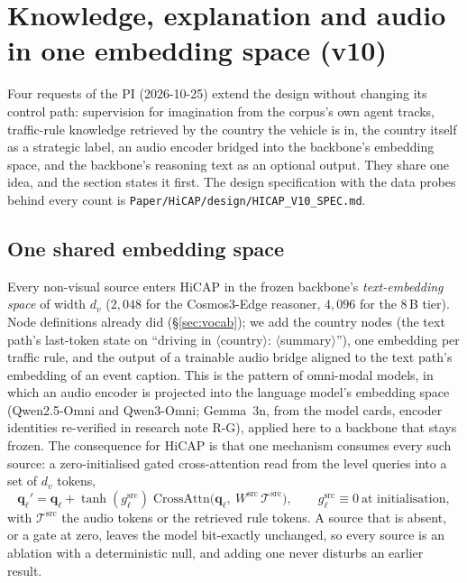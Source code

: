 \section{Knowledge, explanation and audio in one embedding space (v10)}\label{sec:v10}
Four requests of the PI (2026-10-25) extend the design without changing its control path: supervision for imagination from the corpus's own agent tracks, traffic-rule knowledge retrieved by the country the vehicle is in, the country itself as a strategic label, an audio encoder bridged into the backbone's embedding space, and the backbone's reasoning text as an optional output. They share one idea, and the section states it first. The design specification with the data probes behind every count is \texttt{Paper/HiCAP/design/HICAP\_V10\_SPEC.md}.

\subsection{One shared embedding space}\label{sec:shared-space}
Every non-visual source enters HiCAP in the frozen backbone's \emph{text-embedding space} of width $d_v$ ($2{,}048$ for the Cosmos3-Edge reasoner, $4{,}096$ for the 8\,B tier). Node definitions already did (\S\ref{sec:vocab}); we add the country nodes (the text path's last-token state on ``driving in $\langle$country$\rangle$: $\langle$summary$\rangle$''), one embedding per traffic rule, and the output of a trainable audio bridge aligned to the text path's embedding of an event caption. This is the pattern of omni-modal models, in which an audio encoder is projected into the language model's embedding space (Qwen2.5-Omni and Qwen3-Omni; Gemma~3n, \evP{} from the model cards, encoder identities re-verified in research note R-G), applied here to a backbone that stays frozen. The consequence for HiCAP is that one mechanism consumes every such source: a zero-initialised gated cross-attention read from the level queries into a set of $d_v$ tokens,
\begin{equation}
\mathbf q_\ell' = \mathbf q_\ell + \tanh(g^{\text{src}}_\ell)\;\mathrm{CrossAttn}\big(\mathbf q_\ell,\ W^{\text{src}}\,\mathcal T^{\text{src}}\big),\qquad g^{\text{src}}_\ell\equiv0\ \text{at initialisation},
\label{eq:gated-memory}
\end{equation}
with $\mathcal T^{\text{src}}$ the audio tokens or the retrieved rule tokens. A source that is absent, or a gate at zero, leaves the model bit-exactly unchanged, so every source is an ablation with a deterministic null, and adding one never disturbs an earlier result.

